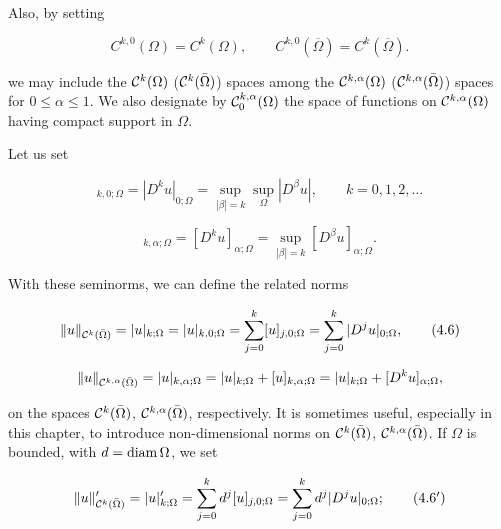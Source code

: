 \begin{definition}\label{gt:def-holder-spaces}
Also, by setting

\[
C^{k,0}(\Omega)=C^k(\Omega),\qquad C^{k,0}(\overline{\Omega})=C^k(\overline{\Omega}).
\]


we may include the $\mathcal{C}^k(\Omega)$ ($\mathcal{C}^k(\bar{\Omega})$) spaces among the $\mathcal{C}^{k,\alpha}(\Omega)$ ($\mathcal{C}^{k,\alpha}(\bar{\Omega})$) spaces for
$0 \le \alpha \le 1$. We also designate by $\mathcal{C}^{k,\alpha}_0(\Omega)$ the space of functions on $\mathcal{C}^{k,\alpha}(\Omega)$ having
compact support in $\Omega$.

\noindent Let us set

\begin{equation}
[u]_{k,0;\Omega} = |D^k u|_{0;\Omega} = \sup_{|\beta| = k}\sup_{\Omega} |D^\beta u|, \qquad k = 0, 1, 2, \ldots
\tag{4.5}
\end{equation}

\begin{equation}
[u]_{k,\alpha;\Omega} = [D^k u]_{\alpha;\Omega} = \sup_{|\beta| = k} [D^\beta u]_{\alpha;\Omega}.
\end{equation}

\noindent With these seminorms, we can define the related norms

\begin{equation}
\|u\|_{\mathcal{C}^k(\bar{\Omega})} = |u|_{k;\Omega} = |u|_{k,0;\Omega} = \sum_{j=0}^k [u]_{j,0;\Omega} = \sum_{j=0}^k |D^j u|_{0;\Omega},
\tag{4.6}
\end{equation}

\begin{equation}
\|u\|_{\mathcal{C}^{k,\alpha}(\bar{\Omega})} = |u|_{k,\alpha;\Omega} = |u|_{k;\Omega} + [u]_{k,\alpha;\Omega}
= |u|_{k;\Omega} + [D^k u]_{\alpha;\Omega},
\end{equation}

\noindent on the spaces $\mathcal{C}^k(\bar{\Omega})$, $\mathcal{C}^{k,\alpha}(\bar{\Omega})$, respectively. It is sometimes useful, especially in
this chapter, to introduce non-dimensional norms on $\mathcal{C}^k(\bar{\Omega})$, $\mathcal{C}^{k,\alpha}(\bar{\Omega})$. If $\Omega$ is
bounded, with $d = \operatorname{diam} \Omega$, we set

\begin{equation}
\|u\|'_{\mathcal{C}^k(\bar{\Omega})} = |u|'_{k;\Omega} = \sum_{j=0}^k d^j [u]_{j,0;\Omega} = \sum_{j=0}^k d^j |D^j u|_{0;\Omega};
\tag{4.6$'$}
\end{equation}


\end{definition}
